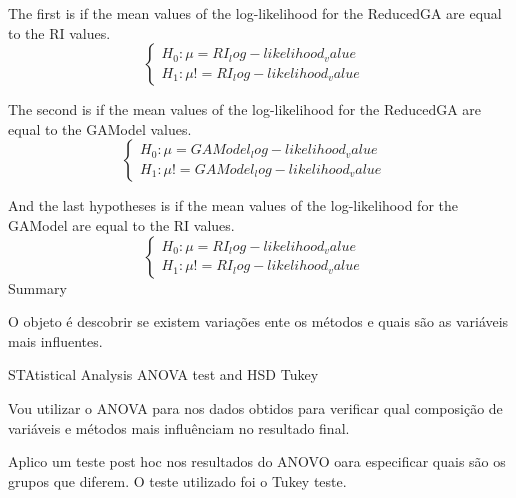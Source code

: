 The first is if the mean values of the log-likelihood for the ReducedGA are equal to the RI values.
$$\begin{cases} H_0: \mu = RI_log-likelihood_value&\\H_1: \mu != RI_log-likelihood_value\end{cases}$$

The second is if the mean values of the log-likelihood for the ReducedGA are equal to the GAModel values.
$$\begin{cases} H_0: \mu = GAModel_log-likelihood_value&\\H_1: \mu != GAModel_log-likelihood_value\end{cases}$$

And the last hypotheses is if the mean values of the log-likelihood for the GAModel are equal to the RI values.
$$\begin{cases} H_0: \mu = RI_log-likelihood_value&\\H_1: \mu != RI_log-likelihood_value\end{cases}$$
Summary
 
O objeto é descobrir se existem variações ente os métodos e quais são as variáveis mais influentes.


STAtistical Analysis
ANOVA test and HSD Tukey

Vou utilizar o ANOVA para nos dados obtidos para verificar qual composição de variáveis e métodos mais influênciam no resultado final.

%
%

Aplico um teste post hoc nos resultados do ANOVO oara especificar quais são os grupos que diferem. O teste utilizado foi o Tukey teste.

